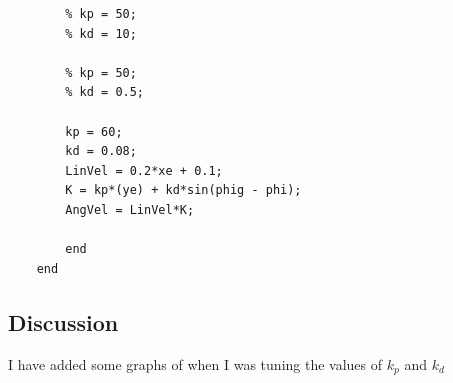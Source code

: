 \documentclass[answers]{exam}
\begin{document}
\begin{questions}
\begin{lstlisting}
        % kp = 50;
        % kd = 10;

        % kp = 50;
        % kd = 0.5;
        
        kp = 60;
        kd = 0.08;
        LinVel = 0.2*xe + 0.1;
        K = kp*(ye) + kd*sin(phig - phi);
        AngVel = LinVel*K;
    
        end
    end
    \end{lstlisting}

    \subsection*{Discussion}
    I have added some graphs of when I was tuning the values of $k_p$ and $k_d$
    \begin{figure}[H]
        \centering
        \qquad
        \qquad
        \label{fig:Comparison}\\


\end{figure}
\end{questions}
\end{document}
